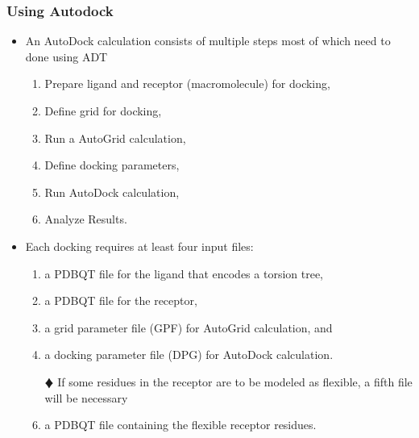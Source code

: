 \documentclass[slidestop,mathserif,compress,xcolor=svgnames]{beamer}
\begin{document}
\begin{frame}
  \frametitle{\small Using Autodock}
  \begin{block}{}
    \begin{itemize}
      \item An AutoDock calculation consists of multiple steps most of which need to done using ADT
      \begin{enumerate}
        \item Prepare ligand and receptor (macromolecule) for docking,
        \item Define grid for docking,
        \item Run a AutoGrid calculation,
        \item Define docking parameters,
        \item Run AutoDock calculation,
        \item Analyze Results.
      \end{enumerate}
      \item Each docking requires at least four input files:
      \begin{enumerate}
        \item a PDBQT file for the ligand that encodes a torsion tree,
        \item a PDBQT file for the receptor,
        \item a grid parameter file (GPF) for AutoGrid calculation, and
        \item a docking parameter file (DPG) for AutoDock calculation.
        \item[$\vardiamond$] If some residues in the receptor are to be modeled as flexible, a fifth file will be necessary
        \item a PDBQT file containing the flexible receptor residues.
      \end{enumerate}
    \end{itemize}
  \end{block}
\end{frame}
\end{document}
